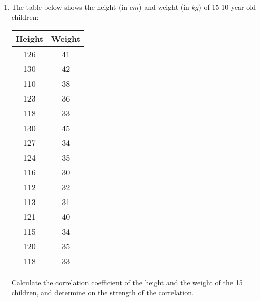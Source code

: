 \documentclass{report}
\begin{document}
\begin{multicols}{2}
  \begin{enumerate}
    \item The table below shows the height (in $cm$) and weight (in $kg$) of 15
          10-year-old children:
          \begin{center}
            \begin{tabular}{|c|c|}
              \hline
              Height & Weight \\
              \hline
              126    & 41     \\
              130    & 42     \\
              110    & 38     \\
              123    & 36     \\
              118    & 33     \\
              130    & 45     \\
              127    & 34     \\
              124    & 35     \\
              116    & 30     \\
              112    & 32     \\
              113    & 31     \\
              121    & 40     \\
              115    & 34     \\
              120    & 35     \\
              118    & 33     \\
              \hline
            \end{tabular}
          \end{center}
          Calculate the correlation coefficient of the height and the weight of the 15 children, and determine on the strength of the correlation.


\end{enumerate}
\end{multicols}
\end{document}
